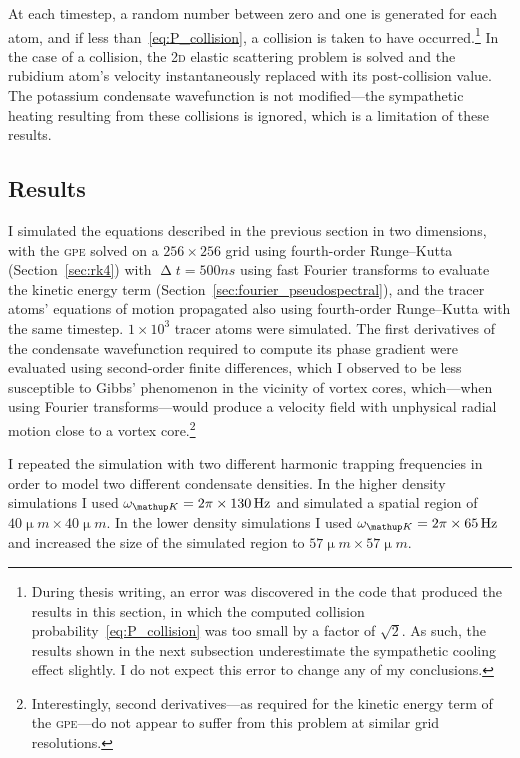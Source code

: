 At each timestep, a random number between zero and one is generated for each atom, and if less than~\eqref{eq:P_collision}, a collision is taken to have occurred.\footnote{During thesis writing, an error was discovered in the code that produced the results in this section, in which the computed collision probability~\eqref{eq:P_collision} was too small by a factor of $\sqrt{2}$. As such, the results shown in the next subsection underestimate the sympathetic cooling effect slightly. I do not expect this error to change any of my conclusions.} In the case of a collision, the \textsc{2d} elastic scattering problem is solved and the rubidium atom's velocity instantaneously replaced with its post-collision value. The potassium condensate wavefunction is not modified---the sympathetic heating resulting from these collisions is ignored, which is a limitation of these results.

\subsection{Results}

I simulated the equations described in the previous section in two dimensions, with the \textsc{gpe} solved on a $256\times256$ grid using fourth-order Runge--Kutta (Section~\ref{sec:rk4}) with $\upDelta t = 500\unit{ns}$ using fast Fourier transforms to evaluate the kinetic energy term (Section~\ref{sec:fourier_pseudospectral}), and the tracer atoms' equations of motion propagated also using fourth-order Runge--Kutta with the same timestep. $1\times10^3$ tracer atoms were simulated. The first derivatives of the condensate wavefunction required to compute its phase gradient were evaluated using second-order finite differences, which I observed to be less susceptible to Gibbs' phenomenon in the vicinity of vortex cores, which---when using Fourier transforms---would produce a velocity field with unphysical radial motion close to a vortex core.\footnote{Interestingly, second derivatives---as required for the kinetic energy term of the \textsc{gpe}---do not appear to suffer from this problem at similar grid resolutions.}

I repeated the simulation with two different harmonic trapping frequencies in order to model two different condensate densities. In the higher density simulations I used $\omega_\up{K}=2\pi\times 130\unit{Hz}$ and simulated a spatial region of $40\unit{\upmu m}\times40\unit{\upmu m}$. In the lower density simulations I used $\omega_\up{K}=2\pi\times 65\unit{Hz}$ and increased the size of the simulated region to $57\unit{\upmu m}\times57\unit{\upmu m}$.

